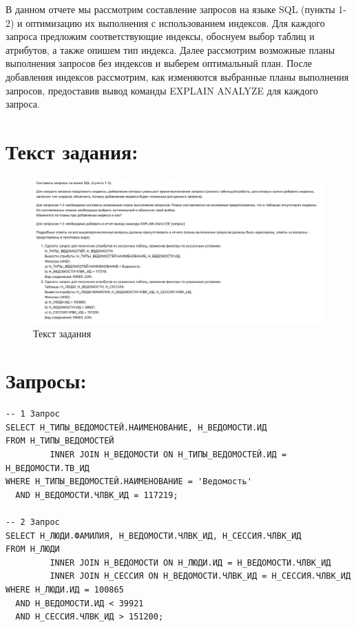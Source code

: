 \documentclass[14pt]{extreport}
\begin{document}
    \pagestyle{empty}
    
    \pagestyle{plain}
    \tableofcontents

    \intro В данном отчете мы рассмотрим составление запросов на языке SQL (пункты 1-2) и оптимизацию их выполнения с использованием индексов. Для каждого запроса предложим соответствующие индексы, обоснуем выбор таблиц и атрибутов, а также опишем тип индекса. Далее рассмотрим возможные планы выполнения запросов без индексов и выберем оптимальный план. После добавления индексов рассмотрим, как изменяются выбранные планы выполнения запросов, предоставив вывод команды EXPLAIN ANALYZE для каждого запроса.

    \chapter{Текст задания:}
        \begin{figure}[h]
            \centering
            \includegraphics[width=0.99\textwidth]{task.png}
            \caption{Текст задания}
        \end{figure}

    \chapter{Запросы:}
    \begin{verbatim}
-- 1 Запрос
SELECT Н_ТИПЫ_ВЕДОМОСТЕЙ.НАИМЕНОВАНИЕ, Н_ВЕДОМОСТИ.ИД
FROM Н_ТИПЫ_ВЕДОМОСТЕЙ
         INNER JOIN Н_ВЕДОМОСТИ ON Н_ТИПЫ_ВЕДОМОСТЕЙ.ИД = Н_ВЕДОМОСТИ.ТВ_ИД
WHERE Н_ТИПЫ_ВЕДОМОСТЕЙ.НАИМЕНОВАНИЕ = 'Ведомость'
  AND Н_ВЕДОМОСТИ.ЧЛВК_ИД = 117219;

-- 2 Запрос
SELECT Н_ЛЮДИ.ФАМИЛИЯ, Н_ВЕДОМОСТИ.ЧЛВК_ИД, Н_СЕССИЯ.ЧЛВК_ИД
FROM Н_ЛЮДИ
         INNER JOIN Н_ВЕДОМОСТИ ON Н_ЛЮДИ.ИД = Н_ВЕДОМОСТИ.ЧЛВК_ИД
         INNER JOIN Н_СЕССИЯ ON Н_ВЕДОМОСТИ.ЧЛВК_ИД = Н_СЕССИЯ.ЧЛВК_ИД
WHERE Н_ЛЮДИ.ИД = 100865
  AND Н_ВЕДОМОСТИ.ИД < 39921
  AND Н_СЕССИЯ.ЧЛВК_ИД > 151200;
    \end{verbatim}
\end{document}
